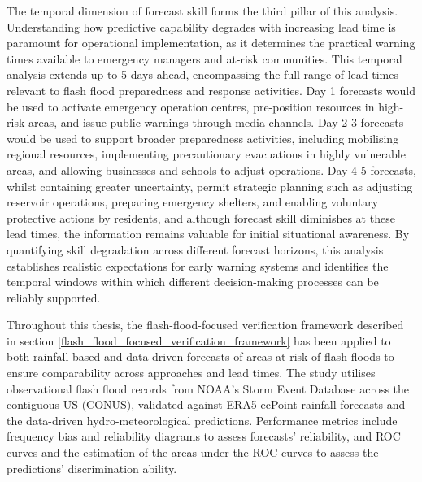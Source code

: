 The temporal dimension of forecast skill forms the third pillar of this analysis. Understanding how predictive capability degrades with increasing lead time is paramount for operational implementation, as it determines the practical warning times available to emergency managers and at-risk communities. This temporal analysis extends up to 5 days ahead, encompassing the full range of lead times relevant to flash flood preparedness and response activities. Day 1 forecasts would be used to activate emergency operation centres, pre-position resources in high-risk areas, and issue public warnings through media channels. Day 2-3 forecasts would be used to support broader preparedness activities, including mobilising regional resources, implementing precautionary evacuations in highly vulnerable areas, and allowing businesses and schools to adjust operations. Day 4-5 forecasts, whilst containing greater uncertainty, permit strategic planning such as adjusting reservoir operations, preparing emergency shelters, and enabling voluntary protective actions by residents, and although forecast skill diminishes at these lead times, the information remains valuable for initial situational awareness. By quantifying skill degradation across different forecast horizons, this analysis establishes realistic expectations for early warning systems and identifies the temporal windows within which different decision-making processes can be reliably supported.

Throughout this thesis, the flash-flood-focused verification framework described in section \ref{flash_flood_focused_verification_framework} has been applied to both rainfall-based and data-driven forecasts of areas at risk of flash floods to ensure comparability across approaches and lead times. The study utilises observational flash flood records from NOAA's Storm  Event Database across the contiguous US (CONUS), validated against ERA5-ecPoint rainfall forecasts and the data-driven hydro-meteorological predictions. Performance metrics include frequency bias and reliability diagrams to assess forecasts' reliability, and ROC curves and the estimation of the areas under the ROC curves to assess the predictions' discrimination ability. 

